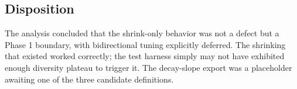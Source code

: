 \subsection{Disposition}

The analysis concluded that the shrink-only behavior was not a defect but a
Phase 1 boundary, with bidirectional tuning explicitly deferred. The shrinking
that existed worked correctly; the test harness simply may not have exhibited
enough diversity plateau to trigger it. The decay-slope export was a placeholder
awaiting one of the three candidate definitions.


